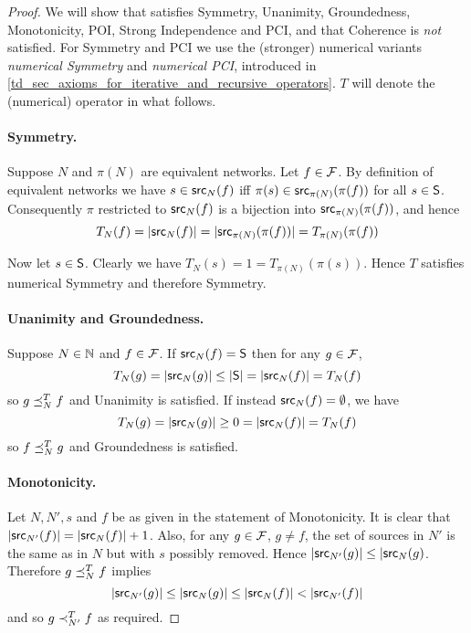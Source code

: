 \begin{proof}

We will show that \voting{} satisfies Symmetry, Unanimity, Groundedness,
Monotonicity, POI, Strong Independence and PCI, and that Coherence is
\emph{not} satisfied. For Symmetry and PCI we use the (stronger) numerical
variants \emph{numerical Symmetry} and \emph{numerical PCI}, introduced in
\cref{td_sec_axioms_for_iterative_and_recursive_operators}. $T$ will denote
the (numerical) \voting{} operator in what follows.

\paragraph{Symmetry.} Suppose $N$ and $\pi(N)$ are equivalent networks. Let $f
\in \F$. By definition of equivalent networks we have $s \in \src_N(f)$ iff
$\pi(s) \in \src_{\pi(N)}(\pi(f))$ for all $s \in \S$. Consequently $\pi$
restricted to $\src_N(f)$ is a bijection into $\src_{\pi(N)}(\pi(f))$, and
hence
\[
    T_N(f) = |\src_N(f)| = |\src_{\pi(N)}(\pi(f))| = T_{\pi(N)}(\pi(f))
\]

Now let $s \in \S$. Clearly we have $T_N(s) = 1 = T_{\pi(N)}(\pi(s))$. Hence
$T$ satisfies numerical Symmetry and therefore Symmetry.

\paragraph{Unanimity and Groundedness.} Suppose $N \in \N$ and $f \in \F$. If
$\src_N(f) = \S$ then for any $g \in \F$,
\[
    T_N(g) = |\src_N(g)| \le |\S| = |\src_N(f)| = T_N(f)
\]
so $g \fle_N^{T} f$ and Unanimity is satisfied. If instead $\src_N(f)
= \emptyset$, we have
\[
    T_N(g) = |\src_N(g)| \ge 0 = |\src_N(f)| = T_N(f)
\]
so $f \fle_N^{T} g$ and Groundedness is satisfied.

\paragraph{Monotonicity.} Let $N, N', s$ and $f$ be as given in the statement
of Monotonicity. It is clear that $|\src_{N'}(f)| = |\src_N(f)| + 1$. Also, for
any $g \in \F$, $g \ne f$, the set of sources in $N'$ is the same as in $N$ but
with $s$ possibly removed. Hence $|\src_{N'}(g)| \le |\src_N(g)$. Therefore $g
\fle_N^{T} f$ implies
\[
    |\src_{N'}(g)| \le |\src_N(g)| \le |\src_N(f)| < |\src_{N'}(f)|
\]
and so $g \flt_{N'}^{T} f$ as required.


\end{proof}
